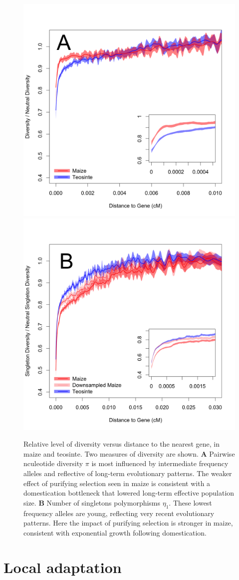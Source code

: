 \documentclass[11pt]{article}
\begin{document}
\begin{figure}[tb]
\centering
\includegraphics[width=.45\textwidth]{figs/distanceToGene_WithSignificance_Folded2_manuscript.png} \includegraphics[width=.45\textwidth]{figs/distanceToGene_WithSignificance_Singletons_Downsampled_threeLines_manuscript.png}
\caption{Relative level of diversity versus distance to the nearest
  gene, in maize and teosinte. Two measures of diversity are shown. \textbf{A} Pairwise
  nculeotide diversity $\pi$ is most influenced by intermediate frequency
  alleles and reflective of long-term evolutionary patterns. The weaker effect of purifying selection seen in maize is consistent with a domestication bottleneck that lowered long-term effective population size. 
  \textbf{B} Number of singletons polymorphisms $\eta_1$. These lowest frequency alleles are young, reflecting very recent evolutionary patterns. Here the impact of purifying selection is stronger in maize, consistent with exponential growth following domestication. \label{fig:purify}}
\end{figure}

\section*{Local adaptation}
\end{document}
